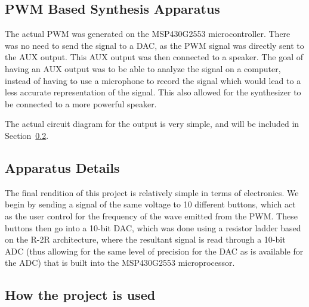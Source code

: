 
\subsection{PWM Based Synthesis Apparatus}\label{subsec:pwm-based-synthesis-apparatus}

The actual PWM was generated on the MSP430G2553 microcontroller.
There was no need to send the signal to a DAC, as the PWM signal was directly sent to the AUX output.
This AUX output was then connected to a speaker.
The goal of having an AUX output was to be able to analyze the signal on a computer, instead of having to use a microphone to record the signal which would lead to a less accurate representation of the signal.
This also allowed for the synthesizer to be connected to a more powerful speaker.

The actual circuit diagram for the output is very simple, and will be included in Section~\ref{subsec:apparatus-details}.


\subsection{Apparatus Details}\label{subsec:apparatus-details}

The final rendition of this project is relatively simple in terms of electronics.
We begin by sending a signal of the same voltage to 10 different buttons, which act as the user control for the frequency of the wave emitted from the PWM\@.
These buttons then go into a 10-bit DAC, which was done using a resistor ladder based on the R-2R architecture, where the resultant signal is read through a 10-bit ADC (thus allowing for the same level of precision for the DAC as is available for the ADC) that is built into the MSP430G2553 microprocessor. %


\subsection{How the project is used}\label{subsec:how-the-project-is-used}


